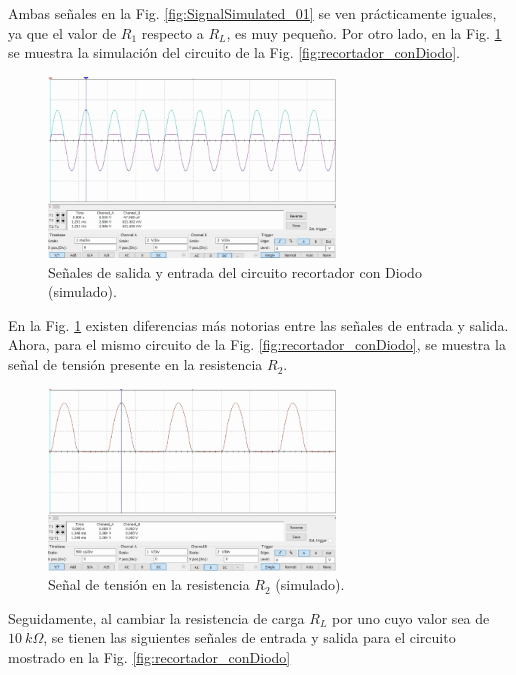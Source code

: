 \documentclass[journal]{IEEEtran}
\begin{document}
Ambas señales en la Fig. \ref{fig:SignalSimulated_01} se ven prácticamente iguales, ya que el valor de $R_1$ respecto a $R_L$, es muy pequeño. Por otro lado, en la Fig. \ref{fig:SignalSimulated_02} se muestra la simulación del circuito de la Fig. \ref{fig:recortador_conDiodo}.

\begin{figure}[H]
        \centering
        \includegraphics[width=3in]{SignalSimulated_02.png}
        \caption{Señales de salida y entrada del circuito recortador con Diodo (simulado).}
        \label{fig:SignalSimulated_02}
\end{figure}

En la Fig. \ref{fig:SignalSimulated_02} existen diferencias más notorias entre las señales de entrada y salida. Ahora, para el mismo circuito de la Fig. \ref{fig:recortador_conDiodo}, se muestra la señal de tensión presente en la resistencia $R_2$.

\begin{figure}[H]
        \centering
        \includegraphics[width=3in]{SignalSimulated_03.png}
        \caption{Señal de tensión en la resistencia $R_2$ (simulado).}
        \label{fig:SignalSimulated_03}
\end{figure}

Seguidamente, al cambiar la resistencia de carga $R_L$ por uno cuyo valor sea de $10~k\Omega$, se tienen las siguientes señales de entrada y salida para el circuito mostrado en la Fig. \ref{fig:recortador_conDiodo}
\end{document}
